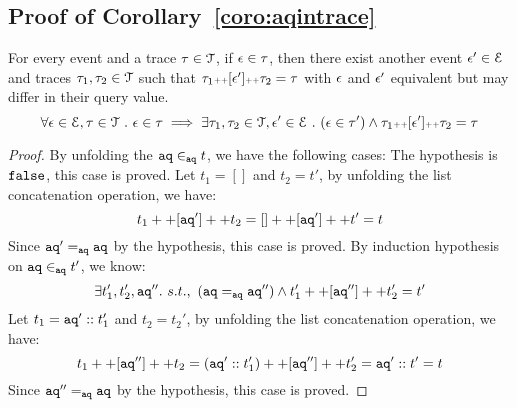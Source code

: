     \subsection{Proof of Corollary~\ref{coro:aqintrace}}
    \label{apdx:aqintrace}
    \begin{corollary}
      For every event and a trace $\mathtt{\tau} \in \mathcal{T}$,
      if $\mathtt{\epsilon} \in \mathtt{\tau}$, 
      then there exist another event $\mathtt{\epsilon}' \in \mathcal{E}$ and traces $\mathtt{\tau}_1, \mathtt{\tau}_2 \in \mathcal{T}$
      such that $\mathtt{\tau}_1 {\scriptscriptstyle ++} [\mathtt{\epsilon}'] {\scriptscriptstyle ++} \mathtt{\tau}_2 = \mathtt{\tau} $
      with 
      $\mathtt{\epsilon}$ and $\mathtt{\epsilon}'$ equivalent but may differ in their query value.
      \[
        \forall \mathtt{\epsilon} \in \mathcal{E}, \mathtt{\tau} \in \mathcal{T} ~.~
      \mathtt{\epsilon} \in \mathtt{\tau} \implies \exists \mathtt{\tau}_1, \mathtt{\tau}_2 \in \mathcal{T}, 
      \mathtt{\epsilon}' \in \mathcal{E} ~.~ (\mathtt{\epsilon} \in \mathtt{\tau}') \land \mathtt{\tau}_1 {\scriptscriptstyle ++} [\mathtt{\epsilon}'] {\scriptscriptstyle ++} \mathtt{\tau}_2 = \mathtt{\tau}  
      \]
      \end{corollary}
    \begin{proof}
    By unfolding the $\mathtt{aq} \in_{\mathtt{aq}} t$, we have the following cases:
     The hypothesis is $\mathtt{false}$, this case is proved.
    Let $t_1 = []$ and $t_2 = t'$, by unfolding the list concatenation operation, we have:
    \[
        t_1 ++ [\mathtt{aq}'] ++ t_2 = [] ++ [\mathtt{aq}'] ++ t' = t
    \]
    Since $\mathtt{aq}' =_{\mathtt{aq}} \mathtt{aq}$ by the hypothesis, this case is proved.
    By induction hypothesis on $\mathtt{aq} \in_{\mathtt{aq}} t'$, we know:
    \[
        \exists t_1', t_2', \mathtt{aq}''. ~ s.t., ~ (\mathtt{aq} =_{\mathtt{aq}} \mathtt{aq}'') \land t_1' ++ [\mathtt{aq}''] ++ t_2' = t'	
    \]
    Let $t_1 = \mathtt{aq}'::t_1'$ and $t_2 = t_2'$, by unfolding the list concatenation operation, we have:
    \[
        t_1 ++ [\mathtt{aq}''] ++ t_2 = (\mathtt{aq}':: t_1') ++ [\mathtt{aq}''] ++ t_2' = \mathtt{aq}'::t' = t
    \]
    Since $\mathtt{aq}'' =_{\mathtt{aq}} \mathtt{aq}$ by the hypothesis, this case is proved.    %
    \end{proof}